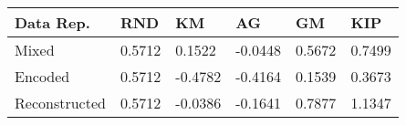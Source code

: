 \begin{tabular}{llllll}
\toprule
Data Rep. & RND & KM & AG & GM & KIP \\
\midrule
Mixed & 0.5712 & 0.1522 & -0.0448 & 0.5672 & 0.7499 \\
Encoded & 0.5712 & -0.4782 & -0.4164 & 0.1539 & 0.3673 \\
Reconstructed & 0.5712 & -0.0386 & -0.1641 & 0.7877 & 1.1347 \\
\bottomrule
\end{tabular}
